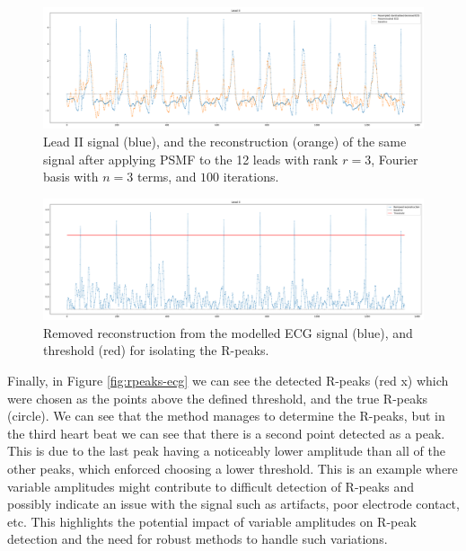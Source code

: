 \documentclass{mldsmsc}
\begin{document}
\begin{figure}[h]
\centering
\includegraphics[width=1\linewidth]{images/r_peaks/resampled_standardised_denoised_ecg_reconstruction_m.pdf}
\caption{Lead II signal (blue), and the reconstruction (orange) of the same signal after applying PSMF to the 12 leads with rank $r = 3$, Fourier basis with $n = 3$ terms, and $100$ iterations.}
\label{fig:reconstr-ecg}
\end{figure}

\begin{figure}[h]
\centering
\includegraphics[width=1\linewidth]{images/r_peaks/resampled_standardised_denoised_ecg_rpeaks_algo_m.pdf}
\caption{Removed reconstruction from the modelled ECG signal (blue), and threshold (red) for isolating the R-peaks.}
\label{fig:diff-ecg}
\end{figure}

\noindent Finally, in Figure \ref{fig:rpeaks-ecg} we can see the detected R-peaks (red x) which were chosen as the points above the defined threshold, and the true R-peaks (circle). We can see that the method manages to determine the R-peaks, but in the third heart beat we can see that there is a second point detected as a peak. This is due to the last peak having a noticeably lower amplitude than all of the other peaks, which enforced choosing a lower threshold. This is an example where variable amplitudes might contribute to difficult detection of R-peaks and possibly indicate an issue with the signal such as artifacts, poor electrode contact, etc. This highlights the potential impact of variable amplitudes on R-peak detection and the need for robust methods to handle such variations. \newline
\end{document}
